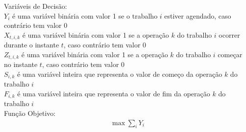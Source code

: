 Variáveis de Decisão: \\
$Y_{i}$ é uma variável binária com valor 1 se o trabalho $i$ estiver agendado, caso contrário tem valor 0 \\
$X_{t,i,k}$ é uma variável binária com valor 1 se a operação $k$ do trabalho $i$ ocorrer durante o instante $t$, caso contrário tem valor 0 \\
$Z_{t,i,k}$ é uma variável binária com valor 1 se a operação $k$ do trabalho $i$ começar no instante $t$, caso contrário tem valor 0 \\
$S_{i,k}$ é uma variável inteira que representa o valor de começo da operação $k$ do trabalho $i$ \\
$F_{i,k}$ é uma variável inteira que representa o valor de fim da operação $k$ do trabalho $i$ \\

Função Objetivo:
\begin{align}
\max \sum_{i}Y_{i} \label{eq:15}
\end{align}

